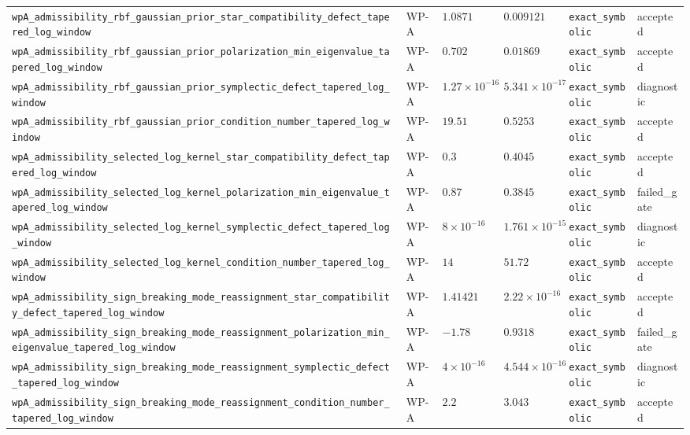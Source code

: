 \begin{table}[t]
\begin{tabular}{@{}llllll@{}}
\texttt{wpA\_admissibility\_rbf\_gaussian\_prior\_star\_compatibility\_defect\_tapered\_log\_window} & WP-A & $1.0871$ & $0.009121$ & \texttt{exact\_symbolic} & accepted \\
\texttt{wpA\_admissibility\_rbf\_gaussian\_prior\_polarization\_min\_eigenvalue\_tapered\_log\_window} & WP-A & $0.702$ & $0.01869$ & \texttt{exact\_symbolic} & accepted \\
\texttt{wpA\_admissibility\_rbf\_gaussian\_prior\_symplectic\_defect\_tapered\_log\_window} & WP-A & $1.27\times10^{-16}$ & $5.341\times10^{-17}$ & \texttt{exact\_symbolic} & diagnostic \\
\texttt{wpA\_admissibility\_rbf\_gaussian\_prior\_condition\_number\_tapered\_log\_window} & WP-A & $19.51$ & $0.5253$ & \texttt{exact\_symbolic} & accepted \\
\texttt{wpA\_admissibility\_selected\_log\_kernel\_star\_compatibility\_defect\_tapered\_log\_window} & WP-A & $0.3$ & $0.4045$ & \texttt{exact\_symbolic} & accepted \\
\texttt{wpA\_admissibility\_selected\_log\_kernel\_polarization\_min\_eigenvalue\_tapered\_log\_window} & WP-A & $0.87$ & $0.3845$ & \texttt{exact\_symbolic} & failed\_gate \\
\texttt{wpA\_admissibility\_selected\_log\_kernel\_symplectic\_defect\_tapered\_log\_window} & WP-A & $8\times10^{-16}$ & $1.761\times10^{-15}$ & \texttt{exact\_symbolic} & diagnostic \\
\texttt{wpA\_admissibility\_selected\_log\_kernel\_condition\_number\_tapered\_log\_window} & WP-A & $14$ & $51.72$ & \texttt{exact\_symbolic} & accepted \\
\texttt{wpA\_admissibility\_sign\_breaking\_mode\_reassignment\_star\_compatibility\_defect\_tapered\_log\_window} & WP-A & $1.41421$ & $2.22\times10^{-16}$ & \texttt{exact\_symbolic} & accepted \\
\texttt{wpA\_admissibility\_sign\_breaking\_mode\_reassignment\_polarization\_min\_eigenvalue\_tapered\_log\_window} & WP-A & $-1.78$ & $0.9318$ & \texttt{exact\_symbolic} & failed\_gate \\
\texttt{wpA\_admissibility\_sign\_breaking\_mode\_reassignment\_symplectic\_defect\_tapered\_log\_window} & WP-A & $4\times10^{-16}$ & $4.544\times10^{-16}$ & \texttt{exact\_symbolic} & diagnostic \\
\texttt{wpA\_admissibility\_sign\_breaking\_mode\_reassignment\_condition\_number\_tapered\_log\_window} & WP-A & $2.2$ & $3.043$ & \texttt{exact\_symbolic} & accepted \\

\end{tabular}
\end{table}

